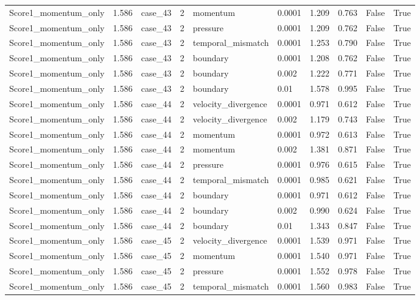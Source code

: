 \begin{longtable}{llllllllll}
Score1\_momentum\_only & 1.586 & case\_43 & 2 & momentum & 0.0001 & 1.209 & 0.763 & False & True \\
Score1\_momentum\_only & 1.586 & case\_43 & 2 & pressure & 0.0001 & 1.209 & 0.762 & False & True \\
Score1\_momentum\_only & 1.586 & case\_43 & 2 & temporal\_mismatch & 0.0001 & 1.253 & 0.790 & False & True \\
Score1\_momentum\_only & 1.586 & case\_43 & 2 & boundary & 0.0001 & 1.208 & 0.762 & False & True \\
Score1\_momentum\_only & 1.586 & case\_43 & 2 & boundary & 0.002 & 1.222 & 0.771 & False & True \\
Score1\_momentum\_only & 1.586 & case\_43 & 2 & boundary & 0.01 & 1.578 & 0.995 & False & True \\
Score1\_momentum\_only & 1.586 & case\_44 & 2 & velocity\_divergence & 0.0001 & 0.971 & 0.612 & False & True \\
Score1\_momentum\_only & 1.586 & case\_44 & 2 & velocity\_divergence & 0.002 & 1.179 & 0.743 & False & True \\
Score1\_momentum\_only & 1.586 & case\_44 & 2 & momentum & 0.0001 & 0.972 & 0.613 & False & True \\
Score1\_momentum\_only & 1.586 & case\_44 & 2 & momentum & 0.002 & 1.381 & 0.871 & False & True \\
Score1\_momentum\_only & 1.586 & case\_44 & 2 & pressure & 0.0001 & 0.976 & 0.615 & False & True \\
Score1\_momentum\_only & 1.586 & case\_44 & 2 & temporal\_mismatch & 0.0001 & 0.985 & 0.621 & False & True \\
Score1\_momentum\_only & 1.586 & case\_44 & 2 & boundary & 0.0001 & 0.971 & 0.612 & False & True \\
Score1\_momentum\_only & 1.586 & case\_44 & 2 & boundary & 0.002 & 0.990 & 0.624 & False & True \\
Score1\_momentum\_only & 1.586 & case\_44 & 2 & boundary & 0.01 & 1.343 & 0.847 & False & True \\
Score1\_momentum\_only & 1.586 & case\_45 & 2 & velocity\_divergence & 0.0001 & 1.539 & 0.971 & False & True \\
Score1\_momentum\_only & 1.586 & case\_45 & 2 & momentum & 0.0001 & 1.540 & 0.971 & False & True \\
Score1\_momentum\_only & 1.586 & case\_45 & 2 & pressure & 0.0001 & 1.552 & 0.978 & False & True \\
Score1\_momentum\_only & 1.586 & case\_45 & 2 & temporal\_mismatch & 0.0001 & 1.560 & 0.983 & False & True \\

\end{longtable}
